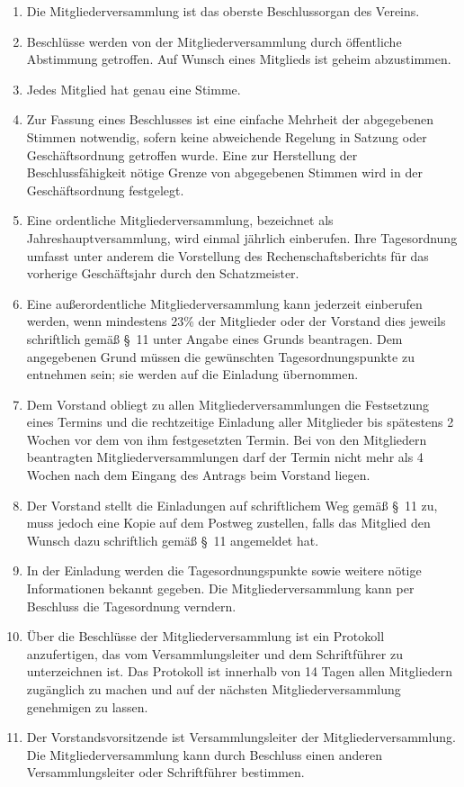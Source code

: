 \documentclass[10pt,a4paper]{scrartcl}
\begin{document}
\begin{enumerate}

        \item Die Mitgliederversammlung ist das oberste Beschlussorgan des Vereins.
	\item Beschl{\"u}sse werden von der Mitgliederversammlung durch {\"o}ffentliche Abstimmung getroffen.
		Auf Wunsch eines Mitglieds ist geheim abzustimmen.
	\item Jedes Mitglied hat genau eine Stimme.
	\item Zur Fassung eines Beschlusses ist eine einfache Mehrheit der abgegebenen Stimmen
             notwendig, sofern keine abweichende Regelung in Satzung oder Gesch{\"a}ftsordnung getroffen wurde.
			 Eine zur Herstellung der Beschlussf{\"a}higkeit n{\"o}tige Grenze von abgegebenen Stimmen wird in der
			 Gesch{\"a}ftsordnung festgelegt.
	\item Eine ordentliche Mitgliederversammlung, bezeichnet als Jahreshauptversammlung,
		wird einmal j{\"a}hrlich einberufen. Ihre Tagesordnung umfasst unter anderem die
		Vorstellung des Rechenschaftsberichts f{\"u}r das vorherige Gesch{\"a}ftsjahr durch
		den Schatzmeister.
	\item Eine au{\ss}erordentliche Mitgliederversammlung kann jederzeit einberufen werden, wenn
		mindestens 23\% der Mitglieder oder der Vorstand dies jeweils schriftlich gem{\"a}{\ss} \S \ 11
		unter Angabe eines Grunds beantragen. Dem angegebenen Grund m{\"u}ssen die gew{\"u}nschten
		Tagesordnungspunkte zu entnehmen sein; sie werden auf die Einladung {\"u}bernommen.
	\item Dem Vorstand obliegt zu allen Mitgliederversammlungen die Festsetzung eines Termins
		und die rechtzeitige Einladung aller Mitglieder bis sp{\"a}testens 2 Wochen vor dem
		von ihm festgesetzten Termin. Bei von den Mitgliedern beantragten
                Mitgliederversammlungen darf der Termin nicht mehr als 4 Wochen nach dem Eingang
		des Antrags beim Vorstand liegen.
	\item Der Vorstand stellt die Einladungen auf schriftlichem Weg gem{\"a}{\ss} \S \ 11 zu, muss
		jedoch eine Kopie auf dem Postweg zustellen, falls das Mitglied den Wunsch dazu
		schriftlich gem{\"a}{\ss} \S \ 11 angemeldet hat.
	\item In der Einladung werden die Tagesordnungspunkte sowie weitere n{\"o}tige Informationen
		bekannt gegeben. Die Mitgliederversammlung kann per Beschluss die Tagesordnung
		verndern.
	\item {\"U}ber die Beschl{\"u}sse der Mitgliederversammlung ist ein Protokoll anzufertigen,
		das vom Versammlungsleiter und dem Schriftf{\"u}hrer zu unterzeichnen ist.
		Das Protokoll ist innerhalb von 14 Tagen allen Mitgliedern zug{\"a}nglich zu
		machen und auf der n{\"a}chsten Mitgliederversammlung genehmigen zu lassen.
	\item Der Vorstandsvorsitzende ist Versammlungsleiter der Mitgliederversammlung.
		Die Mitgliederversammlung kann durch Beschluss einen anderen Versammlungsleiter
		oder Schrift\-f{\"u}h\-rer bestimmen.
\end{enumerate}
%
%
\end{document}
